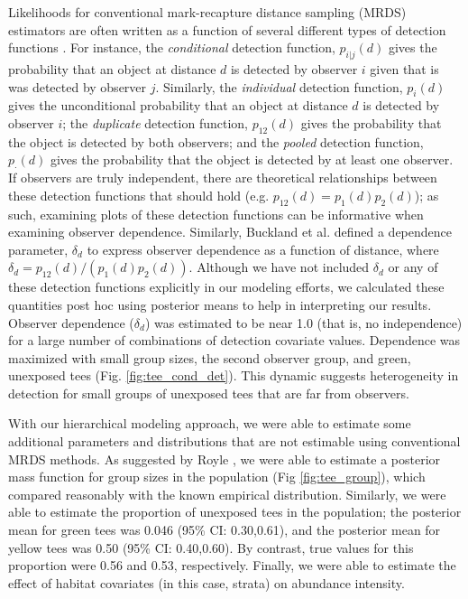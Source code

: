\documentclass[10pt]{article}
\begin{document}
Likelihoods for conventional mark-recapture distance sampling (MRDS) estimators are often written as a function of several different types of detection functions \cite{LaakeBorchers2004}.  For instance, the {\it conditional} detection function, $p_{i|j}(d)$ gives the probability that an object at distance $d$ is detected by observer $i$ given that is was detected by observer $j$. Similarly, the {\it individual} detection function, $p_i(d)$ gives the unconditional probability that an object at distance $d$ is detected by observer $i$; the {\it duplicate} detection function, $p_{12}(d)$ gives the probability that the object is detected by both observers; and the {\it pooled} detection function, $p_\cdot(d)$ gives the probability that the object is detected by at least one observer.  If observers are truly independent, there are theoretical relationships between these detection functions that should hold (e.g. $p_{12}(d)=p_1(d)p_2(d)$); as such, examining plots of these detection functions can be informative when examining observer dependence.  Similarly, Buckland et al. \cite{BucklandEtAl2010} defined a dependence parameter, $\delta_d$ to express observer dependence as a function of distance, where $\delta_d=p_{12}(d)/(p_1(d)p_2(d))$.  Although we have not included $\delta_d$ or any of these detection functions explicitly in our modeling efforts, we calculated these quantities post hoc using posterior means to help in interpreting our results.  Observer dependence ($\delta_d$) was estimated to be near 1.0 (that is, no independence) for a large number of combinations of detection covariate values.  Dependence was maximized with small group sizes, the second observer group, and green, unexposed tees (Fig. \ref{fig:tee_cond_det}).  This dynamic suggests heterogeneity in detection for small groups of unexposed tees that are far from observers.

With our hierarchical modeling approach, we were able to estimate some additional parameters and distributions that are not estimable using conventional MRDS methods.  As suggested by Royle  \cite{Royle2008}, we were able to
estimate a posterior mass function for group sizes in the population (Fig \ref{fig:tee_group}), which compared reasonably with the known empirical distribution.  Similarly, we were able to estimate the proportion of unexposed tees in the population; the posterior mean for green tees was 0.046 (95\% CI: 0.30,0.61), and the posterior mean for yellow tees was 0.50 (95\% CI: 0.40,0.60).  By contrast, true values for this proportion were 0.56 and 0.53, respectively.  Finally, we were able to estimate the effect of habitat covariates (in this case, strata) on abundance intensity.
\end{document}
